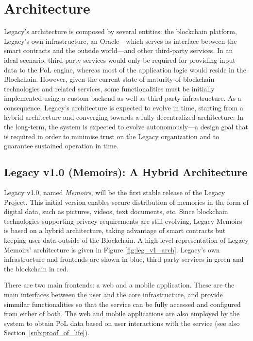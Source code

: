 \chapter{Architecture} %
\label{cha:architecture}

Legacy’s architecture is composed by several entities: the blockchain platform, Legacy’s own infrastructure, an Oracle---which serves as interface between the smart contracts and the outside world---and other third-party services. In an ideal scenario, third-party services would only be required for providing input data to the PoL engine, whereas most of the application logic would reside in the Blockchain. However, given the current state of maturity of blockchain technologies and related services, some functionalities must be initially implemented using a custom backend as well as third-party infrastructure. As a consequence, Legacy’s architecture is expected to evolve in time, starting from a hybrid architecture and converging towards a fully decentralized architecture.
In the long-term, the system is expected to evolve autonomously---a design goal that is required in order to minimise trust on the Legacy organization and to guarantee sustained operation in time.


\section{Legacy v1.0 (Memoirs): A Hybrid Architecture} %
\label{sec:legacy_v1_0_memoirs_a_hybrid_architecture}
Legacy v1.0, named \textit{Memoirs}, will be the first stable release of the Legacy Project. This initial version enables secure distribution of memories in the form of digital data, such as pictures, videos, text documents, etc. Since blockchain technologies supporting privacy requirements are still evolving, Legacy Memoirs is based on a hybrid architecture, taking advantage of smart contracts but keeping user data outside of the Blockchain.
A high-level representation of Legacy Memoirs’ architecture is given in Figure \ref{fig:leg_v1_arch}. Legacy’s own infrastructure and frontends are shown in blue, third-party services in green and the blockchain in red. 

There are two main frontends: a web and a mobile application. These are the main interfaces between the user and the core infrastructure, and provide simmilar functionalities so that the service can be fully accessed and configured from either of both.
The web and mobile applications are also employed by the system to obtain PoL data based on user interactions with the service (see also Section~\ref{sub:proof_of_life}).

